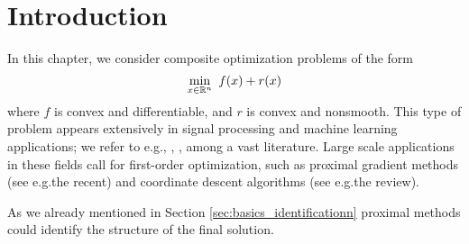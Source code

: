 \section{Introduction}\label{sec:mor-intro}

In this chapter, we consider composite optimization problems of the form
\begin{equation}\label{eq:main_problem}
	\min_{x\in \mathbb{R}^n}~f(x)+r(x)
\end{equation}
where $f$ is convex and differentiable, 
and $r$ is convex and nonsmooth. 
This type of problem appears extensively in signal processing and machine learning applications; we refer to e.g.\;\cite{candes2008enhancing}, \cite{combettes2011proximal}, \cite{bach2012optimization}, among a vast literature. Large scale applications in these fields call for first-order optimization, such as proximal gradient methods
(see e.g.\;the recent\;\cite{teboulle2018simplified}) and coordinate descent algorithms (see e.g.\;the review\;\cite{wright2015coordinate}). 

{\color{blue} As we already mentioned in Section \ref{sec:basics_identificationn} proximal methods could identify the structure of the final solution.}


